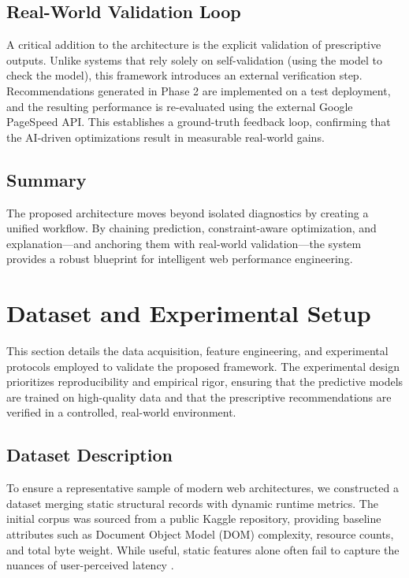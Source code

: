 \documentclass[sn-nature]{sn-jnl}
\begin{document}
\subsection{Real-World Validation Loop}

A critical addition to the architecture is the explicit validation of prescriptive outputs. Unlike systems that rely solely on self-validation (using the model to check the model), this framework introduces an external verification step. Recommendations generated in Phase 2 are implemented on a test deployment, and the resulting performance is re-evaluated using the external Google PageSpeed API. This establishes a ground-truth feedback loop, confirming that the AI-driven optimizations result in measurable real-world gains.

\subsection{Summary}

The proposed architecture moves beyond isolated diagnostics by creating a unified workflow. By chaining prediction, constraint-aware optimization, and explanation—and anchoring them with real-world validation—the system provides a robust blueprint for intelligent web performance engineering.


\section{Dataset and Experimental Setup}\label{sec5}

This section details the data acquisition, feature engineering, and experimental protocols employed to validate the proposed framework. The experimental design prioritizes reproducibility and empirical rigor, ensuring that the predictive models are trained on high-quality data and that the prescriptive recommendations are verified in a controlled, real-world environment.

\subsection{Dataset Description}

To ensure a representative sample of modern web architectures, we constructed a dataset merging static structural records with dynamic runtime metrics. The initial corpus was sourced from a public Kaggle repository, providing baseline attributes such as Document Object Model (DOM) complexity, resource counts, and total byte weight. While useful, static features alone often fail to capture the nuances of user-perceived latency \cite{ghattas2025, mathur2024}.
\end{document}
